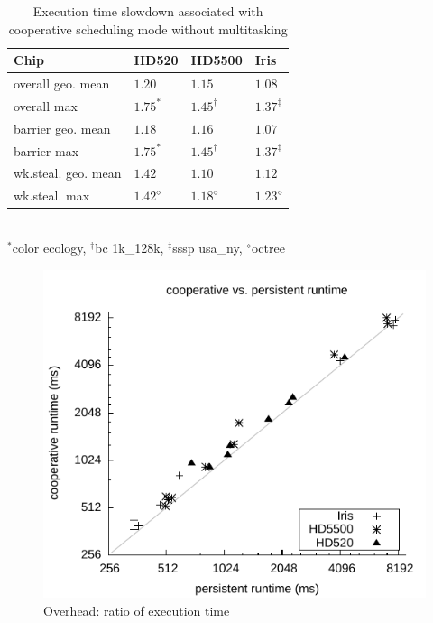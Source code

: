 \documentclass[numbers,nocopyrightspace,10pt]{sigplanconf}
\begin{document}
\begin{table}
\small
\centering
\begin{tabular}{ l l l l }
Chip & HD520 & HD5500 & Iris\\
\hline
overall geo. mean  & $1.20$ & $1.15$ & $1.08$ \\
overall max & $1.75^{\ast}$ & $1.45^{\dagger}$ & $1.37^{\ddagger}$ \\

\hline
barrier geo. mean & $1.18$ & $1.16$ & $1.07$ \\
barrier max & $1.75^{\ast}$ & $1.45^{\dagger}$ & $1.37^{\ddagger}$ \\

\hline
wk.steal. geo. mean & $1.42$ & $1.10$ & $1.12$ \\
wk.steal. max & $1.42^{\diamond}$ & $1.18^{\diamond}$ & $1.23^{\diamond}$ \\

\hline
\end{tabular}\\
{\footnotesize
$^{\ast}$color ecology, $^{\dagger}$bc 1k\_128k, $^{\ddagger}$sssp usa\_ny, $^{\diamond}$octree
}
\caption{Execution time slowdown associated with cooperative scheduling mode without multitasking}
\label{tab:overhead}
\end{table}

\begin{figure}
\includegraphics[width=\columnwidth]{cooperative_overhead.pdf}
\caption{Overhead: ratio of execution time}\label{fig:overhead}
\end{figure}
\end{document}
